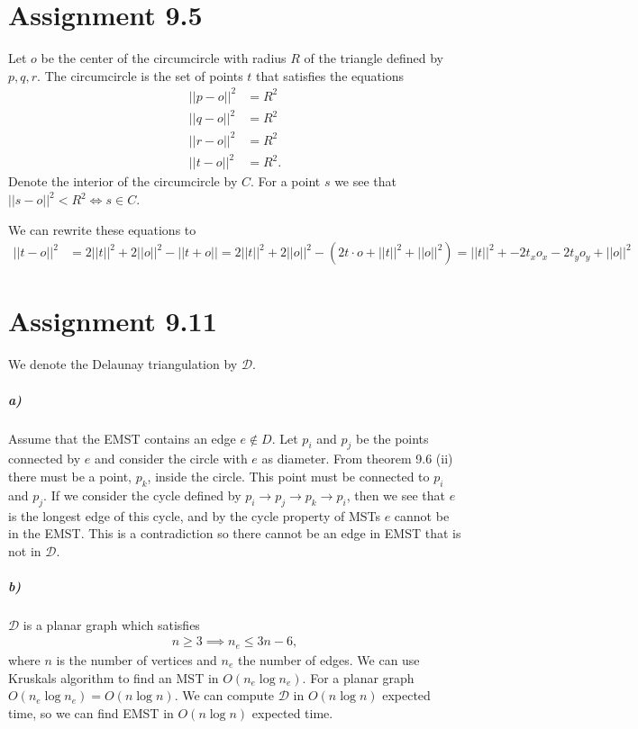 \documentclass[10pt,a4paper,final,oneside,openany,article,oldfontcommands]{memoir}
\newcommand{\D}{\mathcal{D}}
\begin{document}
\chapter*{Assignment 9.5}
Let $o$ be the center of the circumcircle with radius $R$ of the triangle defined by $p, q, r$. The circumcircle is the set of points $t$ that satisfies the equations
\begin{align*}
  ||p - o||^2 &= R^2\\
  ||q - o||^2 &= R^2\\
  ||r - o||^2 &= R^2\\
  ||t - o||^2 &= R^2.
\end{align*}
Denote the interior of the circumcircle by $C$. For a point $s$ we see that $||s - o||^2 < R^2 \iff s \in C$.

We can rewrite these equations to
\begin{align*}
  ||t - o||^2 &= 2||t||^2 + 2||o||^2 - ||t + o||
  = 2||t||^2 + 2||o||^2 - (2 t \cdot o + ||t||^2 + ||o||^2)
  = ||t||^2 +  -2t_xo_x - 2t_yo_y  + ||o||^2
\end{align*}


\chapter*{Assignment 9.11}
We denote the Delaunay triangulation by $\D$.
\paragraph{a)}
Assume that the EMST contains an edge $e \notin D$. Let $p_i$ and $p_j$ be the points connected by $e$ and consider the circle with $e$ as diameter. From theorem 9.6 (ii) there must be a point, $p_k$, inside the circle. This point must be connected to $p_i$ and $p_j$. If we consider the cycle defined by $p_i \to p_j \to p_k \to p_i$, then we see that $e$ is the longest edge of this cycle, and by the cycle property of MSTs $e$ cannot be in the EMST. This is a contradiction so there cannot be an edge in EMST that is not in $\D$.


\paragraph{b)}
$\D$ is a planar graph which satisfies
\begin{align*}
  n \ge 3 \implies n_e \le 3n - 6,
\end{align*}
where $n$ is the number of vertices and $n_e$ the number of edges. We can use Kruskals algorithm to find an MST in $O(n_e \log n_e)$. For a planar graph $O(n_e \log n_e) = O(n \log n)$. We can compute $\D$ in $O(n \log n)$ expected time, so we can find EMST in $O(n \log n)$ expected time.

\printbibliography
\end{document}

